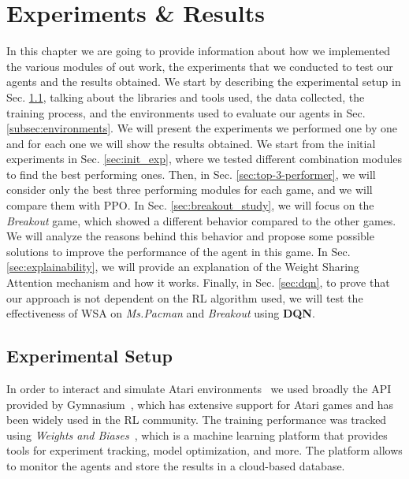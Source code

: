 
\chapter{Experiments \& Results}
\label{ch:experiments_and_results}
In this chapter we are going to provide information about how we implemented the various modules of out work, the experiments that we conducted to test our agents and the results obtained.
We start by describing the experimental setup in Sec. \ref{sec:exp_setup}, talking about the libraries and tools used, the data collected, the training process, and the environments used to evaluate our agents in Sec. \ref{subsec:environments}.
We will present the experiments we performed one by one and for each one we will show the results obtained.
We start from the initial experiments in Sec. \ref{sec:init_exp}, where we tested different combination modules to find the best performing ones.
Then, in Sec. \ref{sec:top-3-performer}, we will consider only the best three performing modules for each game, and we will compare them with PPO\@.
In Sec. \ref{sec:breakout_study}, we will focus on the \textit{Breakout} game, which showed a different behavior compared to the other games.
We will analyze the reasons behind this behavior and propose some possible solutions to improve the performance of the agent in this game.
In Sec. \ref{sec:explainability}, we will provide an explanation of the Weight Sharing Attention mechanism and how it works.
Finally, in Sec. \ref{sec:dqn}, to prove that our approach is not dependent on the RL algorithm used, we will test the effectiveness of WSA on \textit{Ms.Pacman} and \textit{Breakout} using \textbf{DQN}.

\section{Experimental Setup}\label{sec:exp_setup}
In order to interact and simulate Atari environments~\citep{bellemare2013atari} we used broadly the API provided by Gymnasium~\citep{towers_gymnasium_2023}, which has extensive support for Atari games and has been widely used in the RL community.
The training performance was tracked using \textit{Weights and Biases}~\citep{wandb}, which is a machine learning platform that provides tools for experiment tracking, model optimization, and more.
The platform allows to monitor the agents and store the results in a cloud-based database.

